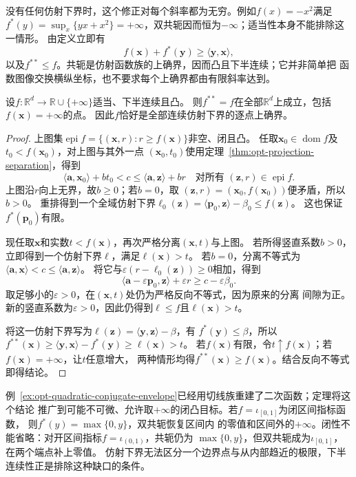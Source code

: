 没有任何仿射下界时，这个修正对每个斜率都为无穷。例如$f(x)=-x^2$满足
$f^*(y)=\sup_x\{yx+x^2\}=+\infty$，双共轭因而恒为$-\infty$；适当性本身不能排除这一情形。
由定义立即有
\[
 f(\bm x)+f^*(\bm y)\geq\langle\bm y,\bm x\rangle,
\]
以及$f^{**}\leq f$。共轭是仿射函数族的上确界，因而凸且下半连续；它并非简单把
函数图像交换横纵坐标，也不要求每个上确界都由有限斜率达到。

\begin{theorem}
\label{thm:opt-fenchel-moreau}
设$f:\mathbb R^d\to\mathbb R\cup\{+\infty\}$适当、下半连续且凸。
则$f^{**}=f$在全部$\mathbb R^d$上成立，包括$f(\bm x)=+\infty$的点。
因此$f$恰好是全部连续仿射下界的逐点上确界。
\end{theorem}

\begin{proof}
上图集$\operatorname{epi}f=\{(\bm x,r):r\geq f(\bm x)\}$非空、闭且凸。
任取$\bm x_0\in\operatorname{dom}f$及$t_0<f(\bm x_0)$，对上图与其外一点
$(\bm x_0,t_0)$使用定理~\ref{thm:opt-projection-separation}，得到
\[
 \langle\bm a,\bm x_0\rangle+b t_0<c
 \leq\langle\bm a,\bm z\rangle+b r
 \quad\text{对所有 }(\bm z,r)\in\operatorname{epi}f.
\]
上图沿$r$向上无界，故$b\geq0$；若$b=0$，取
$(\bm z,r)=(\bm x_0,f(\bm x_0))$便矛盾，所以$b>0$。
重排得到一个全域仿射下界$\ell_0(\bm z)=\langle\bm p_0,\bm z\rangle-\beta_0\leq f(\bm z)$。
这也保证$f^*(\bm p_0)$有限。

现任取$\bm x$和实数$t<f(\bm x)$，再次严格分离$(\bm x,t)$与上图。
若所得竖直系数$b>0$，立即得到一个仿射下界$\ell$，满足$\ell(\bm x)>t$。
若$b=0$，分离不等式为$\langle\bm a,\bm x\rangle<c\leq\langle\bm a,\bm z\rangle$。
将它与$\varepsilon(r-\ell_0(\bm z))\geq0$相加，得到
\[
 \langle\bm a-\varepsilon\bm p_0,\bm z\rangle+\varepsilon r
 \geq c-\varepsilon\beta_0.
\]
取足够小的$\varepsilon>0$，在$(\bm x,t)$处仍为严格反向不等式，因为原来的分离
间隙为正。新的竖直系数为$\varepsilon>0$，因此仍得到$\ell\leq f$且$\ell(\bm x)>t$。

将这一仿射下界写为$\ell(\bm z)=\langle\bm y,\bm z\rangle-\beta$，有
$f^*(\bm y)\leq\beta$，所以
$f^{**}(\bm x)\geq\langle\bm y,\bm x\rangle-f^*(\bm y)
\geq\ell(\bm x)>t$。
若$f(\bm x)$有限，令$t\uparrow f(\bm x)$；若$f(\bm x)=+\infty$，让$t$任意增大，
两种情形均得$f^{**}(\bm x)\geq f(\bm x)$。结合反向不等式即得结论。
\end{proof}

例~\ref{ex:opt-quadratic-conjugate-envelope}已经用切线族重建了二次函数；定理将这个结论
推广到可能不可微、允许取$+\infty$的闭凸目标。若$f=\iota_{[0,1]}$为闭区间指标函数，
则$f^*(y)=\max\{0,y\}$，双共轭恢复区间内
的零值和区间外的$+\infty$。闭性不能省略：对开区间指标$f=\iota_{(0,1)}$，共轭仍为
$\max\{0,y\}$，但双共轭成为$\iota_{[0,1]}$，在两个端点补上零值。
仿射下界无法区分一个边界点与从内部趋近的极限，下半连续性正是排除这种缺口的条件。

